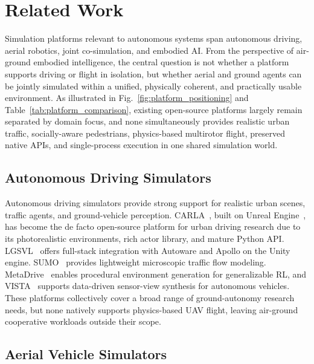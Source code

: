 
\section{Related Work}
\label{sec:related}

Simulation platforms relevant to autonomous systems span autonomous driving,
aerial robotics, joint co-simulation, and embodied AI.
From the perspective of air-ground embodied intelligence, the central question
is not whether a platform supports driving or flight in isolation, but whether
aerial and ground agents can be jointly simulated within a unified, physically
coherent, and practically usable environment.
As illustrated in Fig.~\ref{fig:platform_positioning} and
Table~\ref{tab:platform_comparison}, existing open-source platforms largely
remain separated by domain focus, and none simultaneously provides realistic
urban traffic, socially-aware pedestrians, physics-based multirotor flight,
preserved native APIs, and single-process execution in one shared simulation
world.

\subsection{Autonomous Driving Simulators}
\label{sec:related:driving}

Autonomous driving simulators provide strong support for realistic urban
scenes, traffic agents, and ground-vehicle perception.
CARLA~\cite{carla}, built on Unreal Engine~\cite{ue4}, has become the de facto
open-source platform for urban driving research due to its photorealistic
environments, rich actor library, and mature Python API.
LGSVL~\cite{lgsvl} offers full-stack integration with Autoware and Apollo on
the Unity engine.
SUMO~\cite{sumo} provides lightweight microscopic traffic flow modeling.
MetaDrive~\cite{metadrive} enables procedural environment generation for
generalizable RL, and VISTA~\cite{vista} supports data-driven sensor-view
synthesis for autonomous vehicles.
These platforms collectively cover a broad range of ground-autonomy research
needs, but none natively supports physics-based UAV flight, leaving air-ground
cooperative workloads outside their scope.

\subsection{Aerial Vehicle Simulators}
\label{sec:related:uav}

